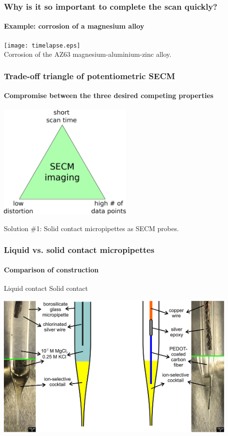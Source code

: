 \documentclass{beamer}
\begin{document}
\begin{frame}
	\frametitle{Why is it so important to complete the scan quickly?}
	\framesubtitle{Example: corrosion of a magnesium alloy}
	\texttt{[image: timelapse.eps]}\\
\centering
Corrosion of the AZ63 magnesium-aluminium-zinc alloy.
\end{frame} 

\begin{frame}
\frametitle{Trade-off triangle of potentiometric SECM}
\framesubtitle{Compromise between the three desired competing properties}
\begin{center}
\includegraphics[width=0.5\textwidth]{trade-off.eps}
\end{center}
\end{frame}

\begin{frame}[plain]
\centering
Solution \#1:
Solid contact micropipettes as SECM probes.
\end{frame}

\begin{frame}
\frametitle{Liquid vs. solid contact micropipettes}
\framesubtitle{Comparison of construction}
\begin{center}
\quad\quad\quad\quad Liquid contact \hfill Solid contact \quad\quad\quad\quad

\includegraphics[width=0.9\textwidth]{liquid_solid.jpg}
\end{center}
\end{frame}
\end{document}
